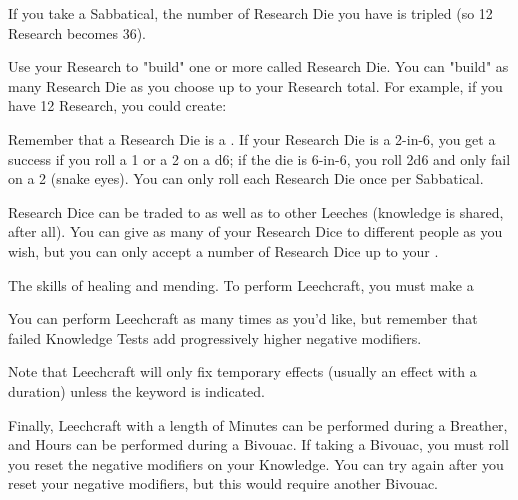 {If you take a Sabbatical, the number of Research Die you have is tripled (so 12 Research becomes 36).

Use your Research to "build" one or more \KNACK called Research Die. You can "build" as many Research Die as you choose up to your Research total. For example, if you have 12 Research, you could create:


Remember that a Research Die is a \KNACK.  If your Research Die is a 2-in-6, you get a success if you roll a 1 or a 2 on a d6; if the die is 6-in-6, you roll 2d6 and only fail on a 2 (snake eyes).  You can only roll each Research Die once per Sabbatical.

Research Dice can be traded to  as well as to other Leeches (knowledge is shared, after all). You can give as many of your Research Dice to different people as you wish, but you can only accept a number of Research Dice up to your .

\newpage


The skills of healing and mending.  To perform Leechcraft, you must make a 




  You can perform Leechcraft as many times as you'd like, but remember that failed Knowledge Tests add progressively higher negative modifiers.

  Note that Leechcraft will only fix temporary effects (usually an effect with a  duration) unless the  keyword is indicated.

  Finally, Leechcraft with a length of Minutes can be performed during a Breather, and Hours can be performed during a Bivouac.  If taking a Bivouac, you must roll  you reset the negative modifiers on your Knowledge.  You can try again after you reset your negative modifiers, but this would require another Bivouac.  

}
